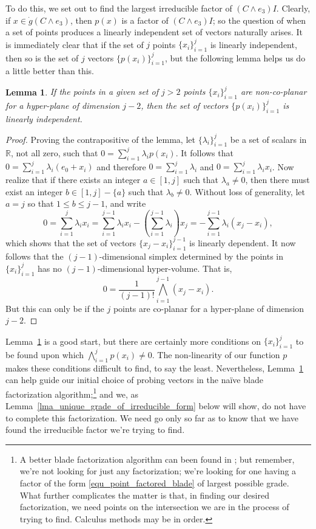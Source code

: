 \documentclass{birkjour}
\newtheorem{lem}[thm]{Lemma}
\theoremstyle{definition}
\theoremstyle{remark}
\numberwithin{equation}{section}
\newcommand{\R}{\mathbb{R}}
\newcommand{\gd}{\dot{g}}
\begin{document}
To do this, we set out to find the largest irreducible factor of $(C\wedge e_3)I$.
Clearly, if $x\in\gd(C\wedge e_3)$, then $p(x)$ is a factor of $(C\wedge e_3)I$; so
the question of when a set of points produces a linearly independent set of
vectors naturally arises.  It is immediately clear that if the set of $j$ points $\{x_i\}_{i=1}^j$
is linearly independent, then so is the set of $j$ vectors $\{p(x_i)\}_{i=1}^j$, but the following
lemma helps us do a little better than this.
\begin{lem}\label{lma_non_co_planar}
If the points in a given set of $j>2$ points $\{x_i\}_{i=1}^j$ are non-co-planar for a hyper-plane of
dimension $j-2$, then the set of vectors $\{p(x_i)\}_{i=1}^j$ is linearly independent.
\end{lem}
\begin{proof}
Proving the contrapositive of the lemma, let $\{\lambda_i\}_{i=1}^j$ be
a set of scalars in $\R$, not all zero, such that $0=\sum_{i=1}^j\lambda_i p(x_i)$.
It follows that $0=\sum_{i=1}^j\lambda_i(e_0+x_i)$ and therefore
$0=\sum_{i=1}^j\lambda_i$ and $0=\sum_{i=1}^j\lambda_i x_i$.
Now realize that if there exists an integer $a\in[1,j]$ such that $\lambda_a\neq 0$,
then there must exist an integer $b\in[1,j]-\{a\}$ such that $\lambda_b\neq 0$.
Without loss of generality, let $a=j$ so that $1\leq b\leq j-1$, and write
\begin{equation*}
0 = \sum_{i=1}^j\lambda_ix_i = \sum_{i=1}^{j-1}\lambda_ix_i - \left(\sum_{i=1}^{j-1}\lambda_i\right)x_j = -\sum_{i=1}^{j-1}\lambda_i(x_j-x_i),
\end{equation*}
which shows that the set of vectors $\{x_j-x_i\}_{i=1}^{j-1}$ is linearly dependent.
It now follows that the $(j-1)$-dimensional simplex determined by the points in $\{x_i\}_{i=1}^j$
has no $(j-1)$-dimensional hyper-volume.  That is,
\begin{equation*}
0 = \frac{1}{(j-1)!}\bigwedge_{i=1}^{j-1}(x_j-x_i).
\end{equation*}
But this can only be if the $j$ points are co-planar for a hyper-plane of dimension $j-2$.
\end{proof}
Lemma~\ref{lma_non_co_planar} is a good start, but there are certainly more conditions on $\{x_i\}_{i=1}^j$ to be found upon which
$\bigwedge_{i=1}^j p(x_i)\neq 0$.  The non-linearity of our function $p$ makes these conditions difficult to find, to say the least.
Nevertheless, Lemma~\ref{lma_non_co_planar} can help guide our initial choice of probing vectors in the na\"{i}ve blade factorization
algorithm;\footnote{A better blade factorization algorithm can been found in \cite{Dorst10}; but remember, we're not looking
for just any factorization; we're looking for one having a factor of the form \eqref{equ_point_factored_blade} of largest possible grade.
What further complicates the matter is that, in finding
our desired factorization, we need points on
the intersection we are in the process of trying to find.  Calculus methods may be in order.} and we, as
Lemma~\ref{lma_unique_grade_of_irreducible_form} below will show,
do not have to complete this factorization.  We need go only so far as to know
that we have found the irreducible factor we're trying to find.
\end{document}
